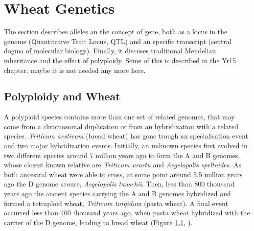 




\section{Wheat Genetics}
The section describes alleles an the concept of gene, both as a locus in the genome (Quantitative Trait Locus, QTL) and an specific transcript (central dogma of molecular biology). Finally, it discuses traditional Mendelian inheritance and the effect of polyploidy.  Some of this is described in the Yr15 chapter, maybe it is not needed any more here. 


\subsection{Polyploidy and Wheat}
\label{lit:polyploidy}

A polyploid species contains more than one set of related genomes, that may come from a chromosomal duplication or from an hybridization with a related species. 
\textit{Triticum aestivum} (bread wheat) has gone trough an specialisation event and two major hybridization events. 
Initially, an unknown species first evolved in two different species around 7 million years ago to form the A and B genomes, whose closest known relative are \textit{Triticum urartu} and \textit{Aegelopolis speltoides}. 
As both ancestral wheat were able to cross, at some point around 5.5 million years ago the D genome arouse, \textit{Aegelopolis tauschii}. 
Then, less than 800 thousand years ago the ancient species carrying the  A and B genomes hybridized and formed a tetraploid wheat, \textit{Triticum turgidum} (pasta wheat). 
A final event occurred less than 400 thousand years ago, when pasta wheat hybridized with the carrier of the D genome, leading to bread wheat (Figure \ref{lit:polyploidy}, \citealt{Marcussen2014}).  

